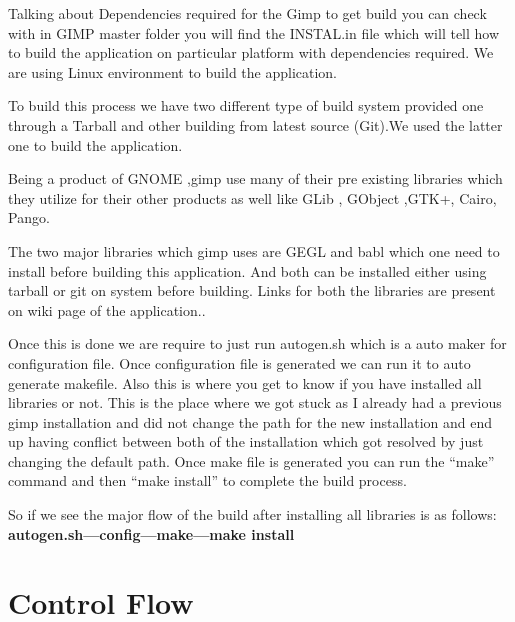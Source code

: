 Talking about Dependencies required for the Gimp to get build you can check with in GIMP master folder you will find the INSTAL.in file which will tell how to build the application on particular platform with dependencies required. We are using Linux environment to build the application.

To build this process we have two different type of	build system provided one through a Tarball and other  building from latest source (Git).We used the latter one to build the application.

Being a product of GNOME ,gimp use many of their pre existing libraries which they utilize for their other products  as well like GLib , GObject ,GTK+, Cairo, Pango. 

The two major libraries which gimp uses are GEGL and babl which one need to install before building this application. And both can be installed either using tarball or git on system before building. Links for both the libraries are present on wiki page of the application.\cite{wiki}.

Once this is done we are require to just run autogen.sh which is a auto maker for configuration file. Once configuration file is generated we can run it to auto generate makefile. Also this is where you get to know if you have installed all libraries or not. This is the place where we got stuck as I already had a previous gimp installation and did not change the path for the new installation and end up having conflict between both of the installation which got resolved by just changing the default path. Once make file is generated you can run the “make” command  and then “make install”  to complete the build process.

So if we see the major flow of the build after installing all libraries is as follows:
\newline
\textbf{ autogen.sh---config---make---make install}
\newline

\section{Control Flow}
